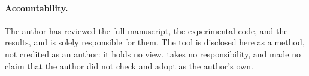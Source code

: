 \documentclass[acmsmall,nonacm,screen]{acmart}
\begin{document}
\paragraph{Accountability.} The author has reviewed the full manuscript, the
experimental code, and the results, and is solely responsible for them. The tool is
disclosed here as a method, not credited as an author: it holds no view, takes no
responsibility, and made no claim that the author did not check and adopt as the
author's own.



\end{document}
